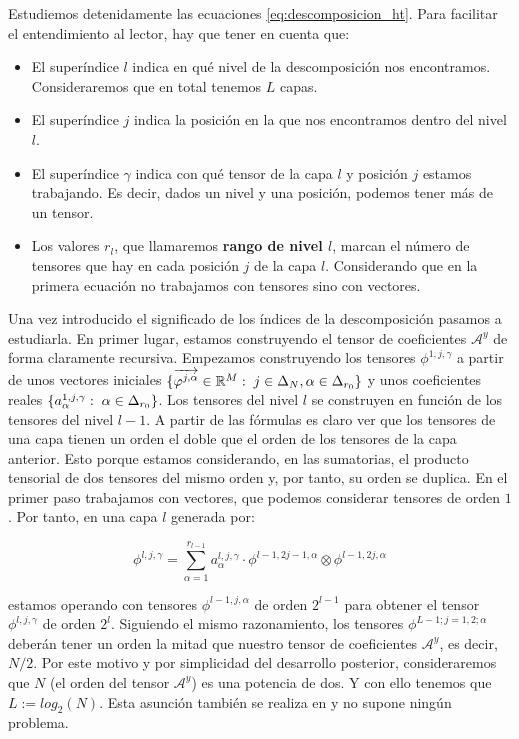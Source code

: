 Estudiemos detenidamente las ecuaciones \eqref{eq:descomposicion_ht}. Para facilitar el entendimiento al lector, hay que tener en cuenta que:

\begin{itemize}
	\item El superíndice $l$ indica en qué nivel de la descomposición nos encontramos. Consideraremos que en total tenemos $L$ capas.
	\item El superíndice $j$ indica la posición en la que nos encontramos dentro del nivel $l$.
	\item El superíndice $\gamma$ indica con qué tensor de la capa $l$ y posición $j$ estamos trabajando. Es decir, dados un nivel y una posición, podemos tener más de un tensor.
	\item Los valores $r_l$, que llamaremos \textbf{rango de nivel $l$}, marcan el número de tensores que hay en cada posición $j$ de la capa $l$. Considerando que en la primera ecuación no trabajamos con tensores sino con vectores.
\end{itemize}

Una vez introducido el significado de los índices de la descomposición pasamos a estudiarla. En primer lugar, estamos construyendo el tensor de coeficientes $\mathcal{A}^y$ de forma claramente recursiva. Empezamos construyendo los tensores $\phi^{1, j, \gamma}$ a partir de unos vectores iniciales $\{\overrightarrow{\varphi^{j, \alpha}} \in \mathbb{R}^M: \; j \in \Delta_{N}, \alpha \in \Delta_{r_0}  \}$  y unos coeficientes reales $\{a_{\alpha}^{1, j, \gamma}: \; \alpha \in \Delta_{r_0}\}$. Los tensores del nivel $l$ se construyen en función de los tensores del nivel $l-1$. A partir de las fórmulas es claro ver que los tensores de una capa tienen un orden el doble que el orden de los tensores de la capa anterior. Esto porque estamos considerando, en las sumatorias, el producto tensorial de dos tensores del mismo orden y, por tanto, su orden se duplica. En el primer paso trabajamos con vectores, que podemos considerar tensores de orden $1$. Por tanto, en una capa $l$ generada por:

\begin{equation}
	\phi^{l, j, \gamma} = \sum_{\alpha = 1}^{r_{l-1}} a_{\alpha}^{l, j, \gamma} \cdot \phi^{l-1, 2j-1, \alpha} \otimes \phi^{l-1, 2j, \alpha}
\end{equation}

estamos operando con tensores $\phi^{l-1, j, \alpha}$ de orden $2^{l-1}$ para obtener el tensor $\phi^{l, j, \gamma}$ de orden $2^l$. Siguiendo el mismo razonamiento, los tensores $\phi^{L-1; j = 1, 2; \alpha}$ deberán tener un orden la mitad que nuestro tensor de coeficientes $\mathcal{A}^y$, es decir, $N / 2$. Por este motivo y por simplicidad del desarrollo posterior, consideraremos que $N$ (el orden del tensor $\mathcal{A}^y$) es una potencia de dos. Y con ello tenemos que $L := log_2(N)$. Esta asunción también se realiza en \cite{matematicas:descomposicion_ht} y no supone ningún problema.

